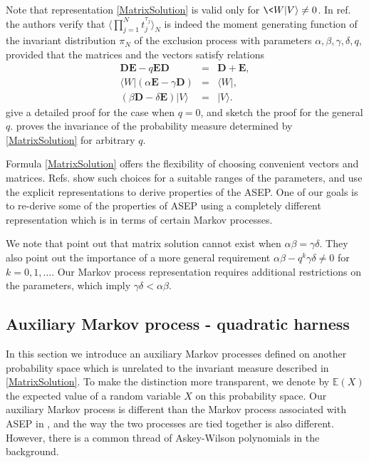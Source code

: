\documentclass{amsart}
\theoremstyle{definition}
\theoremstyle{remark}
\theoremstyle{remark}
\theoremstyle{definition}
\numberwithin{equation}{section}
\begin{document}
Note that   representation \eqref{MatrixSolution}   is valid only for $\<W|V{\rangle}\ne0$.  In ref. \cite{derrida1993exact} the authors verify  that $\langle \prod_{j=1}^N t_j^{\tau_j}\rangle_N$ is indeed the
moment generating function of the invariant
 distribution $\pi_N$ of the exclusion process with parameters $\alpha,\beta,\gamma,\delta, q$, provided that
   the matrices and the vectors satisfy relations
 \begin{eqnarray}
  {\mathbf{D}}{\mathbf{E}}-q{\mathbf{E}}{\mathbf{D}}&=&{\mathbf{D}}+{\mathbf{E}} ,\label{q-comm-Derrida}\\
\langle W|(\alpha {\mathbf{E}}-\gamma {\mathbf{D}})&=&\langle W| ,\label{W}\\
(\beta {\mathbf{D}}-\delta {\mathbf{E}})|V\rangle&=&|V\rangle. \label{V}
\end{eqnarray}
\citet{derrida1993exact} give a detailed proof   for the case when $q=0$, and sketch the proof for the general $q$.
\citet[Section III]{sandow1994partially}  proves the invariance of the probability
measure determined by \eqref{MatrixSolution} for arbitrary $q$.

Formula \eqref{MatrixSolution} offers the flexibility of choosing convenient vectors and matrices.
Refs. \cite{derrida1993exact,derrida2003exact,enaud2004large} \cite{sasamoto1999one} \cite{uchiyama2004asymmetric} show such choices for a suitable
 ranges of the parameters,
  and use the explicit representations to derive   properties of the ASEP.
One of our goals is to re-derive some of the properties of ASEP using a
completely different representation which is  in terms of certain Markov processes.

  We note that  \citet[page 1384]{essler1996representations} point out that  matrix solution cannot exist when $\alpha\beta=\gamma\delta$.
 They also point out the importance of a more general requirement $\alpha\beta-q^k\gamma\delta\ne0$ for $k=0,1,\dots$.
 Our Markov process representation requires additional restrictions on the parameters, which imply $\gamma\delta<\alpha\beta$.

\subsection{Auxiliary Markov process - quadratic harness}\label{AMP}
In this section we introduce an auxiliary Markov processes defined on another probability space
which is unrelated to the invariant measure described in \eqref{MatrixSolution}.
To make the distinction more transparent,
we denote by ${\mathds{E}}(X)$ the expected value of a random variable $X$ on this probability space. Our auxiliary Markov process is different than  the
 Markov process associated with ASEP  in \cite{corteel2007markov}, and the way the two processes are tied together is also different. However, there is a common thread of Askey-Wilson polynomials in the background.
\end{document}
